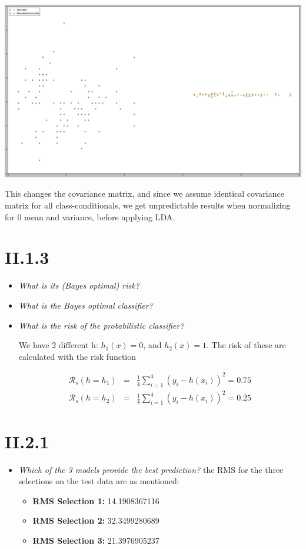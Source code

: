 \documentclass[12pt, a4paper]{article}
\begin{document}
\includegraphics[scale=0.25]{lda_normalized_side.png}

This changes the covariance matrix, and since we assume identical covariance matrix for all class-conditionals, we get unpredictable results when normalizing for 0 mean and variance, before applying LDA.

\section{II.1.3}
\begin{itemize}
\item \textit{What is its (Bayes optimal) risk?}
\item \textit{What is the Bayes optimal classifier?}
\item \textit{What is the risk of the probabilistic classifier?}

We have 2 different h: $h_1(x) = 0$, and $h_2(x) = 1$. The risk of these are calculated with the risk function

\begin{eqnarray}
	\mathcal{R}_s(h = h_1) &=& \frac{1}{4} \sum^4_{i=1} (y_i - h(x_i))^2 = 0.75 \\
	\mathcal{R}_s(h = h_2) &=& \frac{1}{4} \sum^4_{i=1} (y_i - h(x_i))^2 = 0.25
\end{eqnarray}

\end{itemize}

\section{II.2.1}
\begin{itemize}
\item \textit{Which of the 3 models provide the best prediction?}
the RMS for the three selections on the test data are as mentioned:
\begin{itemize}
\item \textbf{RMS Selection 1:} 14.1908367116
\item \textbf{RMS Selection 2:} 32.3499280689 
\item \textbf{RMS Selection 3:} 21.3976905237
\end{itemize}
\end{itemize}
\end{document}
